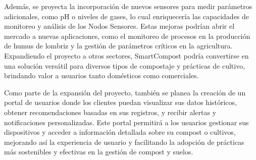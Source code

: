 Además, se proyecta la incorporación de nuevos sensores para medir parámetros adicionales, como pH o niveles de gases, lo cual enriquecería las capacidades de monitoreo y análisis de los Nodos Sensores. Estas mejoras podrían abrir el mercado a nuevas aplicaciones, como el monitoreo de procesos en la producción de humus de lombriz y la gestión de parámetros críticos en la agricultura. Expandiendo el proyecto a otros sectores, SmartCompost podría convertirse en una solución versátil para diversos tipos de compostaje y prácticas de cultivo, brindando valor a usuarios tanto domésticos como comerciales.

Como parte de la expansión del proyecto, también se planea la creación de un portal de usuarios donde los clientes puedan visualizar sus datos históricos, obtener recomendaciones basadas en sus registros, y recibir alertas y notificaciones personalizadas. Este portal permitirá a los usuarios gestionar sus dispositivos y acceder a información detallada sobre su compost o cultivos, mejorando así la experiencia de usuario y facilitando la adopción de prácticas más sostenibles y efectivas en la gestión de compost y suelos.

